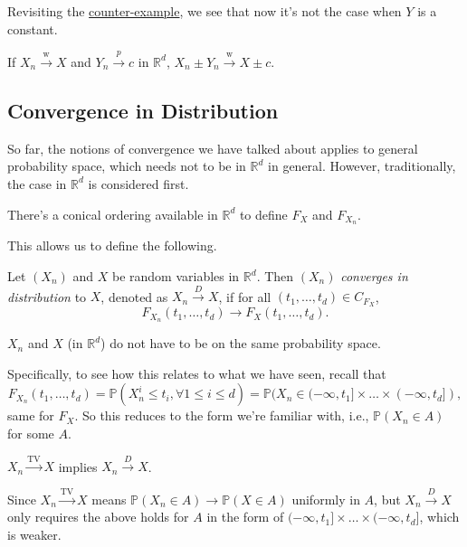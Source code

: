 Revisiting the \hyperref[eg:counter-example-continuous-mapping]{counter-example}, we see that now it's not the case when \(Y\) is a constant.

\begin{corollary}\label{col:Slutsky}
	If \(X_n \overset{\text{w} }{\to } X \) and \(Y_n \overset{p}{\to } c\) in \(\mathbb{R} ^d\), \(X_n \pm Y_n \overset{\text{w} }{\to } X \pm c\).
\end{corollary}

\subsection{Convergence in Distribution}
So far, the notions of convergence we have talked about applies to general probability space, which needs not to be in \(\mathbb{R} ^d\) in general. However, traditionally, the case in \(\mathbb{R} ^d\) is considered first.

\begin{intuition}
	There's a conical ordering available in \(\mathbb{R} ^d\) to define \(F_X\) and \(F_{X_n}\).
\end{intuition}

This allows us to define the following.

\begin{definition}\label{def:converge-in-distribution}
	Let \((X_n)\) and \(X\) be random variables in \(\mathbb{R} ^d\). Then \((X_n)\) \emph{converges in distribution} to \(X\), denoted as \(X_n \overset{D}{\to } X\), if for all \((t_1, \dots , t_d) \in C_{F_X}\),
	\[
		F_{X_n} (t_1, \dots , t_d) \to F_X (t_1, \dots , t_d).
	\]
\end{definition}

\begin{note}
	\(X_n\) and \(X\) (in \(\mathbb{R} ^d\)) do not have to be on the same probability space.
\end{note}

Specifically, to see how this relates to what we have seen, recall that
\[
	F_{X_n}(t_1, \dots , t_d)
	= \mathbb{P} (X_n^i \leq t_i , \forall1 \leq i \leq d)
	= \mathbb{P} (X_n \in (-\infty , t_1] \times \dots \times (-\infty , t_d]),
\]
same for \(F_X\). So this reduces to the form we're familiar with, i.e., \(\mathbb{P} (X_n \in A)\) for some \(A\).

\begin{remark}
	\(X_n \overset{\operatorname{TV} }{\to } X\) implies \(X_n \overset{D}{\to } X\).
\end{remark}
\begin{explanation}
	Since \(X_n \overset{\operatorname{TV} }{\to } X \) means \(\mathbb{P} (X_n \in A) \to \mathbb{P} (X \in A)\) uniformly in \(A\), but \(X_n \overset{D}{\to } X\) only requires the above holds for \(A\) in the form of \((-\infty , t_1] \times \dots \times (-\infty , t_d]\), which is weaker.
\end{explanation}

